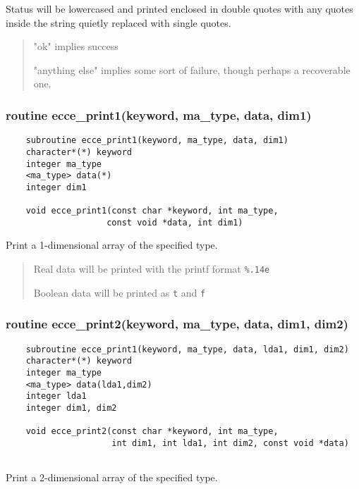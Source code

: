     Status will be lowercased and printed enclosed in double quotes with 
    any quotes inside the string quietly replaced with single quotes.
\begin{quotation}

  "ok" implies success

  "anything else" implies some sort of failure, though perhaps a
  recoverable one.

\end{quotation}

\subsubsection{ routine ecce\_print1(keyword, ma\_type, data, dim1) }

\begin{verbatim}
    subroutine ecce_print1(keyword, ma_type, data, dim1)
    character*(*) keyword
    integer ma_type
    <ma_type> data(*)
    integer dim1

    void ecce_print1(const char *keyword, int ma_type,  
                    const void *data, int dim1)
\end{verbatim}

Print a 1-dimensional array of the specified type.  

    \begin{quotation}

      Real data will be printed with the printf format \texttt{\%.14e}

      Boolean data will be printed as \texttt{t} and \texttt{f}

     \end{quotation}

\subsubsection{ routine ecce\_print2(keyword, ma\_type, data, dim1, dim2)}

\begin{verbatim}
    subroutine ecce_print1(keyword, ma_type, data, lda1, dim1, dim2)
    character*(*) keyword
    integer ma_type
    <ma_type> data(lda1,dim2)
    integer lda1
    integer dim1, dim2

    void ecce_print2(const char *keyword, int ma_type, 
                     int dim1, int lda1, int dim2, const void *data)
                    
\end{verbatim}

Print a 2-dimensional array of the specified type.  

